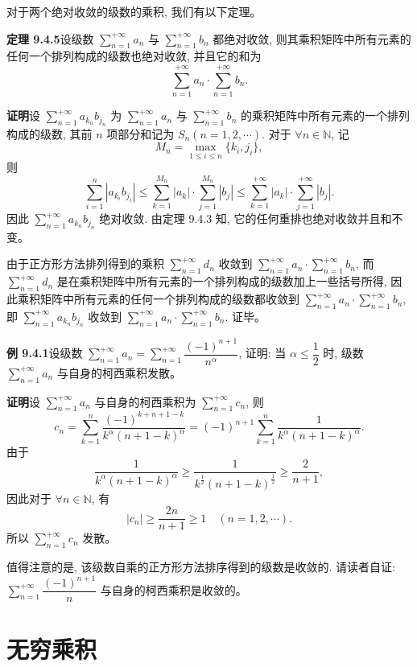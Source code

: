 \documentclass[UTF8,12pt,a4paper,fontset=fandol]{ctexart}
\begin{document}
对于两个绝对收敛的级数的乘积, 我们有以下定理。

\noindent\textbf{定理 9.4.5}\quad 设级数 $\sum\limits_{n=1}^{+\infty}a_n$ 与 $\sum\limits_{n=1}^{+\infty}b_n$ 都绝对收敛, 则其乘积矩阵中所有元素的任何一个排列构成的级数也绝对收敛, 并且它的和为
\[
  \sum_{n=1}^{+\infty}a_n\cdot\sum_{n=1}^{+\infty}b_n.
\]

\noindent\textbf{证明}\quad 设 $\sum\limits_{n=1}^{+\infty}a_{k_n}b_{j_n}$ 为 $\sum\limits_{n=1}^{+\infty}a_n$ 与 $\sum\limits_{n=1}^{+\infty}b_n$ 的乘积矩阵中所有元素的一个排列构成的级数, 其前 $n$ 项部分和记为 $S_n(n=1,2,\cdots)$. 对于 $\forall n\in\mathbb{N}$, 记
\[
  M_n=\max_{1\leq i\leq n}\{k_i,j_i\},
\]
则
\[
  \sum_{i=1}^n|a_{k_i}b_{j_i}|
  \leq\sum_{k=1}^{M_n}|a_k|\cdot\sum_{j=1}^{M_n}|b_j|
  \leq\sum_{k=1}^{+\infty}|a_k|\cdot\sum_{j=1}^{+\infty}|b_j|.
\]
因此 $\sum\limits_{n=1}^{+\infty}a_{k_n}b_{j_n}$ 绝对收敛. 由定理 9.4.3 知, 它的任何重排也绝对收敛并且和不变。

由于正方形方法排列得到的乘积 $\sum\limits_{n=1}^{+\infty}d_n$ 收敛到 $\sum\limits_{n=1}^{+\infty}a_n\cdot\sum\limits_{n=1}^{+\infty}b_n$, 而 $\sum\limits_{n=1}^{+\infty}d_n$ 是在乘积矩阵中所有元素的一个排列构成的级数加上一些括号所得, 因此乘积矩阵中所有元素的任何一个排列构成的级数都收敛到 $\sum\limits_{n=1}^{+\infty}a_n\cdot\sum\limits_{n=1}^{+\infty}b_n$, 即 $\sum\limits_{n=1}^{+\infty}a_{k_n}b_{j_n}$ 收敛到 $\sum\limits_{n=1}^{+\infty}a_n\cdot\sum\limits_{n=1}^{+\infty}b_n$. 证毕。

\noindent\textbf{例 9.4.1}\quad 设级数 $\sum\limits_{n=1}^{+\infty}a_n=\sum\limits_{n=1}^{+\infty}\dfrac{(-1)^{n+1}}{n^\alpha}$, 证明: 当 $\alpha\leq\dfrac12$ 时, 级数 $\sum\limits_{n=1}^{+\infty}a_n$ 与自身的柯西乘积发散。

\noindent\textbf{证明}\quad 设 $\sum\limits_{n=1}^{+\infty}a_n$ 与自身的柯西乘积为 $\sum\limits_{n=1}^{+\infty}c_n$, 则
\[
  c_n=\sum_{k=1}^n\frac{(-1)^{k+n+1-k}}{k^\alpha(n+1-k)^\alpha}
  =(-1)^{n+1}\sum_{k=1}^n\frac1{k^\alpha(n+1-k)^\alpha}.
\]
由于
\[
  \frac1{k^\alpha(n+1-k)^\alpha}
  \geq\frac1{k^{\frac12}(n+1-k)^{\frac12}}
  \geq\frac2{n+1},
\]
因此对于 $\forall n\in\mathbb{N}$, 有
\[
  |c_n|\geq\frac{2n}{n+1}\geq1\quad(n=1,2,\cdots).
\]
所以 $\sum\limits_{n=1}^{+\infty}c_n$ 发散。

值得注意的是, 该级数自乘的正方形方法排序得到的级数是收敛的. 请读者自证: $\sum\limits_{n=1}^{+\infty}\dfrac{(-1)^{n+1}}{n}$ 与自身的柯西乘积是收敛的。

\section{无穷乘积}
\end{document}
